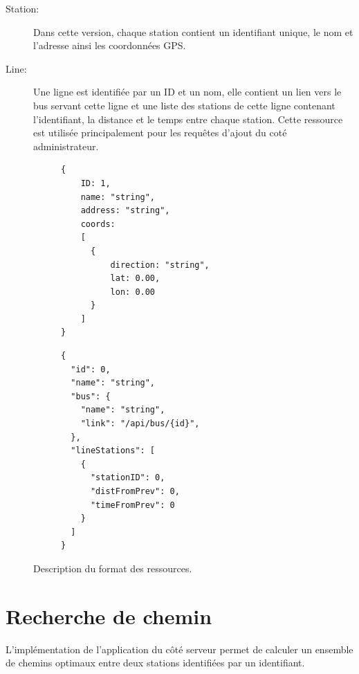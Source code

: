 \begin{description}
	\item[Station:] Dans cette version, chaque station contient un identifiant unique, le nom et l'adresse ainsi les coordonnées GPS.
	\item[Line:] Une ligne est identifiée par un ID et un nom, elle contient un lien vers le bus servant cette ligne et une liste des stations de cette ligne contenant l'identifiant, la distance et le temps entre chaque station. Cette ressource  est utilisée principalement pour les requêtes d'ajout du coté administrateur.
\end{description}
\lstset{style=JSON}

\begin{figure}[h!]
	\begin{subfigure}[b]{0.45\linewidth}
		\begin{lstlisting}[caption=Format JSON de Station]
{
	ID: 1,
	name: "string",
	address: "string",
	coords: 
	[
	  {
	  	  direction: "string",
  		  lat: 0.00,
   		  lon: 0.00
	  }
	]
}
		\end{lstlisting}
	\end{subfigure}\hfill%
	\begin{subfigure}[b]{0.45\linewidth}
		\begin{lstlisting}[caption=Format JSON de Line]
{
  "id": 0,
  "name": "string",
  "bus": {
    "name": "string",
    "link": "/api/bus/{id}",
  },
  "lineStations": [
    {
      "stationID": 0,
      "distFromPrev": 0,
      "timeFromPrev": 0
    }
  ]
}
		\end{lstlisting}
	\end{subfigure}\hfill%
	\caption{Description du format des ressources.}
	\label{fig:formatResources}
\end{figure}


\section{Recherche de chemin}
L'implémentation de l'application du côté serveur permet de calculer un ensemble de chemins optimaux entre deux stations identifiées par un identifiant.
